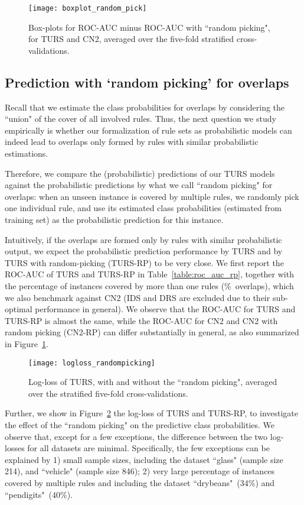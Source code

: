 
\begin{figure}[ht] \centering
\texttt{[image: boxplot\_random\_pick]}	
\caption{Box-plots for ROC-AUC minus ROC-AUC with ``random picking", for TURS and CN2, averaged over the five-fold stratified cross-validations. } \label{fig:diff_rp}
\end{figure}

\subsection{Prediction with `random picking' for overlaps}
Recall that we estimate the class probabilities for overlaps by considering the ``union" of the cover of all involved rules. Thus, the next question we study empirically is whether our formalization of rule sets as probabilistic models can indeed lead to overlaps only formed by rules with similar probabilistic estimations. 

Therefore, we compare the (probabilistic) predictions of our TURS models against the probabilistic predictions by what we call ``random picking" for overlaps: when an unseen instance is covered by multiple rules, we randomly pick one individual rule, and use its estimated class probabilities (estimated from training set) as the probabilistic prediction for this instance. 

Intuitively, if the overlaps are formed only by rules with similar probabilistic output, we expect the probabilistic prediction performance by TURS and by TURS with random-picking (TURS-RP) to be very close. We first report the ROC-AUC of TURS and TURS-RP in Table~\ref{table:roc_auc_rp}, together with the percentage of instances covered by more than one rules (\%~overlaps), which we also benchmark against CN2 (IDS and DRS are excluded due to their sub-optimal performance in general). We observe that the ROC-AUC for TURS and TURS-RP is almost the same, while the ROC-AUC for CN2 and CN2 with random picking (CN2-RP) can differ substantially in general, as also summarized in Figure~\ref{fig:diff_rp}.
\begin{figure}[ht] \centering 
	\texttt{[image: logloss\_randompicking]}
	\caption{Log-loss of TURS, with and without the ``random picking", averaged over the stratified five-fold cross-validations. } \label{fig:logloss_rp}
\end{figure}

Further, we show in Figure~\ref{fig:logloss_rp} the log-loss of TURS and TURS-RP, to investigate the effect of the ``random picking" on the predictive class probabilities. We observe that, except for a few exceptions, the difference between the two log-losses for all datasets are minimal. Specifically, the few exceptions can be explained by 1) small sample sizes, including the dataset ``glass" (sample size 214), and ``vehicle" (sample size 846); 2) very large percentage of instances covered by multiple rules and including the dataset ``drybeans"~(34\%) and ``pendigits"~(40\%). 

